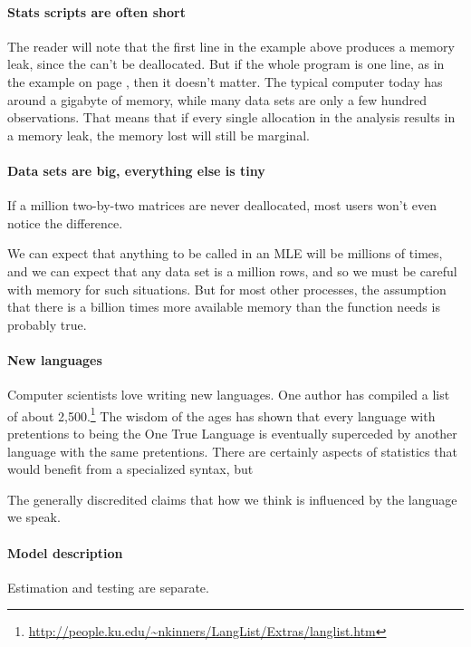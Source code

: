 {\paragraph{Stats scripts are often short}
The reader will note that the first line in the example above
produces a memory leak, since the  can't be
deallocated. But if the whole program is one line, as in the example on
page \pageref{oneliner}, then it doesn't matter. The typical computer
today has around a gigabyte of memory, while many data sets are only a few
hundred observations. That means that if every single allocation in the
analysis results in a memory leak, the memory lost will still be marginal.

\paragraph{Data sets are big, everything else is tiny}
If a million two-by-two matrices are never deallocated, most
users won't even notice the difference.

We can expect that anything to be called in an MLE will be millions of
times, and we can expect that any data set is a million rows, and so we
must be careful with memory for such situations. But for most other
processes, the assumption that there is a billion times more available
memory than the function needs is probably true.


\paragraph{New languages} Computer scientists love writing new
languages.  One author has compiled a list of about
2,500.\footnote{\url{http://people.ku.edu/~nkinners/LangList/Extras/langlist.htm}}
The wisdom of the ages has shown that every language with pretentions
to being the One True Language is eventually superceded by another
language with the same pretentions. There are certainly aspects of
statistics that would benefit from a specialized syntax, but 


The
generally discredited  claims that how we
think is influenced by the language we speak. 

\paragraph{Model description} Estimation and testing are separate.

}



